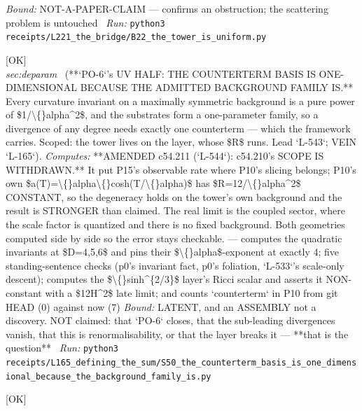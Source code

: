 \begin{description}
 \emph{Bound:} NOT-A-PAPER-CLAIM --- confirms an obstruction; the scattering problem is untouched
\ \emph{Run:} \texttt{python3 receipts/L221\_the\_bridge/B22\_the\_tower\_is\_uniform.py}
\item[\label{rcpt:S50_the_counterterm_basis_is_one_dimensional_because_the_background_family_is}\texttt{S50\_the\_counterterm\_basis\_is\_one\_dimensional\_because\_the\_background\_family\_is}]\hfill\textsf{[OK]}\\
\textit{sec:deparam} \ (**`PO-6`'s UV HALF: THE COUNTERTERM BASIS IS ONE-DIMENSIONAL BECAUSE THE ADMITTED BACKGROUND FAMILY IS.** Every curvature invariant on a maximally symmetric background is a pure power of \$1/\textbackslash\{\}alpha\textasciicircum{}2\$, and the substrates form a one-parameter family, so a divergence of any degree needs exactly one counterterm --- which the framework carries.  Scoped: the tower lives on the layer, whose \$R\$ runs. Lead `L-543`; VEIN `L-165`). 
\emph{Computes:}  **AMENDED c54.211 (`L-544`): c54.210's SCOPE IS WITHDRAWN.** It put P15's observable rate where P10's slicing belongs; P10's own \$a(T)=\textbackslash\{\}alpha\textbackslash\{\}cosh(T/\textbackslash\{\}alpha)\$ has \$R=12/\textbackslash\{\}alpha\textasciicircum{}2\$ CONSTANT, so the degeneracy holds on the tower's own background and the result is STRONGER than claimed. The real limit is the coupled sector, where the scale factor is quantized and there is no fixed background. Both geometries computed side by side so the error stays checkable. --- computes the quadratic invariants at \$D=4,5,6\$ and pins their \$\textbackslash\{\}alpha\$-exponent at exactly 4; five standing-sentence checks (p0's invariant fact, p0's foliation, `L-533`'s scale-only descent); computes the \$\textbackslash\{\}sinh\textasciicircum{}\{2/3\}\$ layer's Ricci scalar and asserts it NON-constant with a \$12H\textasciicircum{}2\$ late limit; and counts `counterterm` in P10 from git HEAD (0) against now (7)
 \emph{Bound:} LATENT, and an ASSEMBLY not a discovery. NOT claimed: that `PO-6` closes, that the sub-leading divergences vanish, that this is renormalisability, or that the layer breaks it --- **that is the question**
\ \emph{Run:} \texttt{python3 receipts/L165\_defining\_the\_sum/S50\_the\_counterterm\_basis\_is\_one\_dimensional\_because\_the\_background\_family\_is.py}
\item[\label{rcpt:G51_the_twelve_can_all_exit_non_zero_and_the_backlog_is_an_artefact}\texttt{G51\_the\_twelve\_can\_all\_exit\_non\_zero\_and\_the\_backlog\_is\_an\_artefact}]\hfill\textsf{[OK]}\\

\end{description}
